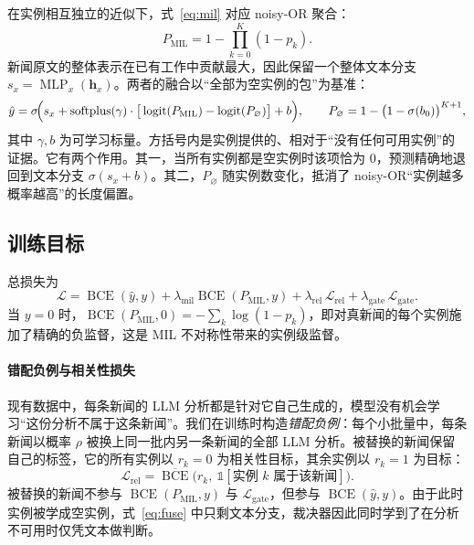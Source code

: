 在实例相互独立的近似下，式~\eqref{eq:mil} 对应 noisy-OR 聚合\citep{maron1998framework}：
\begin{equation}
P_{\mathrm{MIL}}=1-\prod_{k=0}^{K}(1-p_k).
\end{equation}
新闻原文的整体表示在已有工作中贡献最大\citep{he2026factguard}，因此保留一个整体文本分支 $s_x=\operatorname{MLP}_x(\bm h_x)$。两者的融合以“全部为空实例的包”为基准：
\begin{equation}
\hat y=\sigma\!\Big(s_x+\operatorname{softplus}(\gamma)\cdot\big[\operatorname{logit}(P_{\mathrm{MIL}})-\operatorname{logit}(P_{\varnothing})\big]+b\Big),\qquad
P_{\varnothing}=1-\big(1-\sigma(b_0)\big)^{K+1},\label{eq:fuse}
\end{equation}
其中 $\gamma,b$ 为可学习标量。方括号内是实例提供的、相对于“没有任何可用实例”的证据。它有两个作用。其一，当所有实例都是空实例时该项恰为 $0$，预测精确地退回到文本分支 $\sigma(s_x+b)$。其二，$P_{\varnothing}$ 随实例数变化，抵消了 noisy-OR“实例越多概率越高”的长度偏置。

\subsection{训练目标}\label{sec:loss}

总损失为
\begin{equation}
\mathcal L=\operatorname{BCE}(\hat y,y)+\lambda_{\mathrm{mil}}\operatorname{BCE}(P_{\mathrm{MIL}},y)+\lambda_{\mathrm{rel}}\,\mathcal L_{\mathrm{rel}}+\lambda_{\mathrm{gate}}\,\mathcal L_{\mathrm{gate}} .
\end{equation}
当 $y{=}0$ 时，$\operatorname{BCE}(P_{\mathrm{MIL}},0)=-\sum_k\log(1-p_k)$，即对真新闻的每个实例施加了精确的负监督，这是 MIL 不对称性带来的实例级监督。

\paragraph{错配负例与相关性损失}
现有数据中，每条新闻的 LLM 分析都是针对它自己生成的，模型没有机会学习“这份分析不属于这条新闻”。我们在训练时构造\emph{错配负例}：每个小批量中，每条新闻以概率 $\rho$ 被换上同一批内另一条新闻的全部 LLM 分析。被替换的新闻保留自己的标签，它的所有实例以 $r_k=0$ 为相关性目标，其余实例以 $r_k=1$ 为目标：
\begin{equation}
\mathcal L_{\mathrm{rel}}=\overline{\operatorname{BCE}}\big(r_k,\ \mathbb{1}[\text{实例 }k\text{ 属于该新闻}]\big).
\end{equation}
被替换的新闻不参与 $\operatorname{BCE}(P_{\mathrm{MIL}},y)$ 与 $\mathcal L_{\mathrm{gate}}$，但参与 $\operatorname{BCE}(\hat y,y)$。由于此时实例被学成空实例，式~\eqref{eq:fuse} 中只剩文本分支，裁决器因此同时学到了在分析不可用时仅凭文本做判断。

